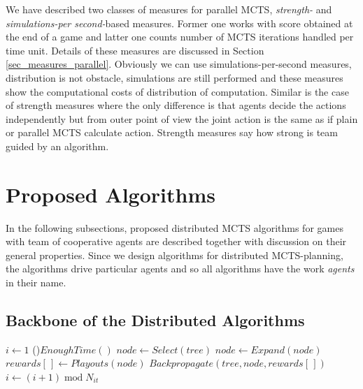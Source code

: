 We have described two classes of measures for parallel MCTS, \emph{strength-} and
\emph{simulations-per second-}based measures. Former one works with score obtained at the end
of a game and latter one counts number of MCTS iterations handled per time unit. Details of
these measures are discussed in Section \ref{sec_measures_parallel}. Obviously we can use
simulations-per-second measures, distribution is not obstacle, simulations are still performed
and these measures show the computational costs of distribution of computation. Similar is the
case of strength measures where the only difference is that agents decide the actions
independently but from outer point of view the joint action is the same as if plain or parallel
MCTS calculate action. Strength measures say how strong is team guided by an algorithm.



\section{Proposed Algorithms}

In the following subsections, proposed distributed MCTS algorithms for games with team of cooperative agents
are described together with discussion on their general properties. Since we design algorithms
for distributed MCTS-planning, the algorithms drive particular agents and so all algorithms
have the work \emph{agents} in their name.

\subsection{Backbone of the Distributed Algorithms}
\label{sec_dmcts_common}

\begin{algorithm}
\DontPrintSemicolon
\caption{$DistributedMCTSLoop(tree)$\label{alg_dmcts_common}}
$i \leftarrow 1$\;
\While(){$EnoughTime()$}{
    $node \leftarrow Select(tree)$ \;
    $node \leftarrow Expand(node)$ \;
    $rewards[\,] \leftarrow Playouts(node)$ \;
    $Backpropagate(tree,node,rewards[\,])$ \;
    $i \leftarrow (i + 1)\;\mathrm{mod}\;N_{it}$\;
}
 \;
\end{algorithm}

